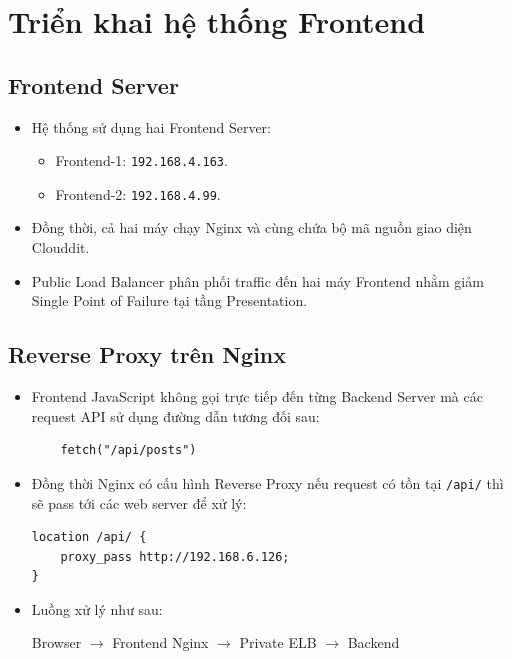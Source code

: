 \documentclass[12pt, a4paper]{article}
\begin{document}
\section{Triển khai hệ thống Frontend}

\subsection{Frontend Server}

\begin{itemize}

\item Hệ thống sử dụng hai Frontend Server:

        \begin{itemize}
            \item Frontend-1: \texttt{192.168.4.163}.
            \item Frontend-2: \texttt{192.168.4.99}.
        \end{itemize}

\item Đồng thời, cả hai máy chạy Nginx và cùng chứa bộ mã nguồn giao diện Clouddit.

\item Public Load Balancer phân phối traffic đến hai máy Frontend nhằm giảm Single Point of Failure tại tầng Presentation.
\end{itemize}

\subsection{Reverse Proxy trên Nginx}

\begin{itemize}

\item Frontend JavaScript không gọi trực tiếp đến từng Backend Server mà các request API sử dụng đường dẫn tương đối sau:
    
    \begin{lstlisting}
    fetch("/api/posts")
    \end{lstlisting}

\item Đồng thời Nginx có cấu hình Reverse Proxy nếu request có tồn tại \texttt{/api/} thì sẽ pass tới các web server để xử lý:

\begin{lstlisting}
location /api/ {
    proxy_pass http://192.168.6.126;
}
\end{lstlisting}

\item Luồng xử lý như sau:

\begin{center}
Browser
$\rightarrow$
Frontend Nginx
$\rightarrow$
Private ELB
$\rightarrow$
Backend
\end{center}
\end{itemize}
\end{document}

